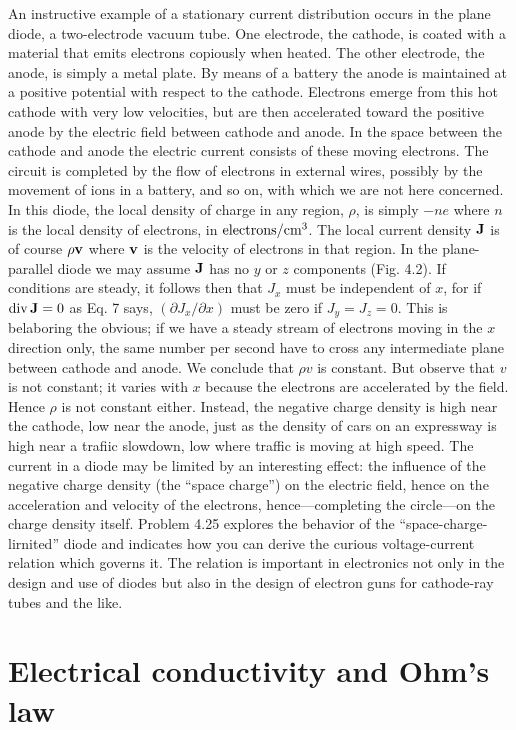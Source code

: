 An instructive example of a stationary current distribution occurs
in the plane diode, a two-electrode vacuum tube. One electrode, the
cathode, is coated with a material that emits electrons copiously
when heated. The other electrode, the anode, is simply a metal plate.
By means of a battery the anode is maintained at a positive potential
with respect to the cathode. Electrons emerge from this hot
cathode with very low velocities, but are then accelerated toward the
positive anode by the electric field between cathode and anode. In
the space between the cathode and anode the electric current consists
of these moving electrons. The circuit is completed by the flow
of electrons in external wires, possibly by the movement of ions in
a battery, and so on, with which we are not here concerned. In this
diode, the local density of charge in any region, $\rho$, is simply $-ne$
where $n$ is the local density of electrons, in $\textup{electrons}/\textup{cm}^3$. The local
current density $\mathbf{J}$ is of course $\rho \mathbf{v}$ where $\mathbf{v}$ is the velocity of electrons
in that region. In the plane-parallel diode we may assume $\mathbf{J}$ has no
$y$ or $z$ components (Fig. 4.2). If conditions are steady, it follows
then that $J_x$ must be independent of $x$, for if $\operatorname{div}\mathbf{J} = 0$ as Eq. 7 says,
$(\partial J_x/\partial x)$ must be zero if $J_y = J_z = 0$. This is belaboring the obvious;
if we have a steady stream of electrons moving in the $x$ direction
only, the same number per second have to cross any intermediate
plane between cathode and anode. We conclude that $\rho v$ is constant.
But observe that $v$ is not constant; it varies with $x$ because the electrons
are accelerated by the field. Hence $\rho$ is not constant either.
Instead, the negative charge density is high near the cathode, low
near the anode, just as the density of cars on an expressway is high
near a trafiic slowdown, low where traffic is moving at high speed.
The current in a diode may be limited by an interesting effect: the
influence of the negative charge density (the ``space charge'') on the
electric field, hence on the acceleration and velocity of the electrons,
hence---completing the circle---on the charge density itself. 
Problem 4.25 explores the behavior of the ``space-charge-lirnited'' diode
and indicates how you can derive the curious voltage-current relation
which governs it. The relation is important in electronics not only
in the design and use of diodes but also in the design of electron guns
for cathode-ray tubes and the like.

\section{Electrical conductivity and Ohm's law}

